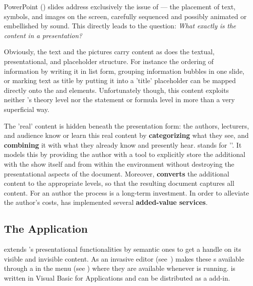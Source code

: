 PowerPoint ({\ppt}) slides address exclusively the issue of {} ---
the placement of text, symbols, and images on the screen, carefully sequenced and possibly
animated or embellished by sound. This directly leads to the question: {\emph{What exactly
    is the content in a {\ppt} presentation?}}

Obviously, the text and the pictures carry content as does the textual, presentational,
and placeholder structure.  For instance the ordering of information by writing it in list
form, grouping information bubbles in one slide, or marking text as title by putting it
into a 'title' placeholder can be mapped directly onto the {\omdoc} {}
and {} elements.  Unfortunately though, this content exploits neither
{\omdoc}'s theory level nor the statement or formula level in more than a very superficial
way.

The 'real' content is hidden beneath the presentation form: the authors, lecturers, and
audience know or learn this real content by {\bf categorizing} what they see, and {\bf
  combining} it with what they already know and presently hear. {\cpoint} stands for '{}'. It models this by
providing the author with a tool to explicitly store the additional {}
with the {\ppt} show itself and from within the {\ppt} environment without destroying the
presentational aspects of the {\ppt} document. Moreover, {\cpoint} {\bf converts} the
additional content to the appropriate {\omdoc} levels, so that the resulting {\omdoc}
document captures all content.  For an author the {} process is
a long-term investment. In order to alleviate the author's costs, {\cpoint} has
implemented several {\bf added-value services}.

\subsection{The {\cpoint} Application}\label{sec:cpoint-app}
{\cpoint} extends {\ppt}'s
presentational functionalities by semantic ones to get a handle on its visible and
invisible content. As an invasive editor (see~\cite{Kohlhase:ophcie95}) {\cpoint} makes these
{s} available through a {} in the
{\ppt} menu (see {}) where they are available whenever {\ppt} is
running. {\cpoint} is written in Visual Basic for Applications and can be distributed as a
{\ppt} add-in.

